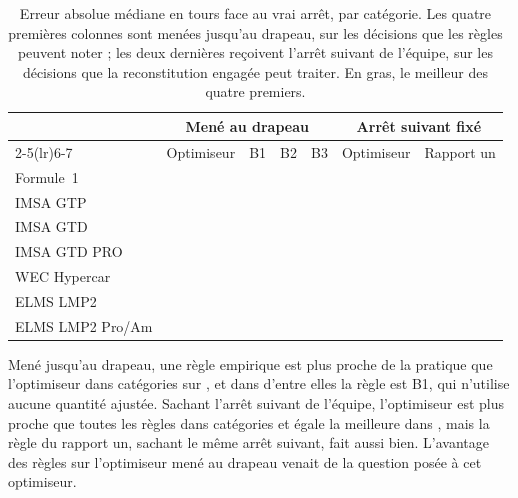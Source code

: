 \documentclass[11pt,a4paper]{article}
\begin{document}
\begin{table}[htbp]
\centering
\caption{Erreur absolue médiane en tours face au vrai arrêt, par catégorie. Les
quatre premières colonnes sont menées jusqu'au drapeau, sur les \NScored{}
décisions que les règles peuvent noter ; les deux dernières reçoivent l'arrêt
suivant de l'équipe, sur les décisions que la reconstitution engagée peut
traiter. En gras, le meilleur des quatre premiers.}
\label{tab:baselines}
\begin{tabular}{lrrrrrr}
\toprule
& \multicolumn{4}{c}{Mené au drapeau} & \multicolumn{2}{c}{Arrêt suivant fixé} \\
\cmidrule(lr){2-5}\cmidrule(lr){6-7}
& Optimiseur & B1 & B2 & B3 & Optimiseur & Rapport un \\
\midrule
Formule~1        & \FoneModelError{}            & \FoneBoneError{}            & \textbf{\FoneBtwoError{}}   & \FoneBthreeError{} & \FoneCommitError{} & \FoneRatioOneError{} \\
IMSA GTP         & \ImsaGtpModelError{}         & \ImsaGtpBoneError{}         & \ImsaGtpBtwoError{}         & \ImsaGtpBthreeError{} & \ImsaGtpCommitError{} & \ImsaGtpRatioOneError{} \\
IMSA GTD         & \ImsaGtdModelError{}         & \textbf{\ImsaGtdBoneError{}}     & \ImsaGtdBtwoError{}    & \ImsaGtdBthreeError{} & \ImsaGtdCommitError{} & \ImsaGtdRatioOneError{} \\
IMSA GTD PRO     & \ImsaGtdproModelError{}      & \textbf{\ImsaGtdproBoneError{}}  & \ImsaGtdproBtwoError{} & \ImsaGtdproBthreeError{} & \ImsaGtdproCommitError{} & \ImsaGtdproRatioOneError{} \\
WEC Hypercar     & \WecHypercarModelError{}     & \WecHypercarBoneError{}     & \WecHypercarBtwoError{}     & \textbf{\WecHypercarBthreeError{}} & \WecHypercarCommitError{} & \WecHypercarRatioOneError{} \\
ELMS LMP2        & \textbf{\ElmsLmptwoModelError{}} & \ElmsLmptwoBoneError{}  & \ElmsLmptwoBtwoError{}      & \ElmsLmptwoBthreeError{} & \ElmsLmptwoCommitError{} & \ElmsLmptwoRatioOneError{} \\
ELMS LMP2 Pro/Am & \ElmsLmptwoProAmModelError{} & \textbf{\ElmsLmptwoProAmBoneError{}} & \ElmsLmptwoProAmBtwoError{} & \ElmsLmptwoProAmBthreeError{} & \ElmsLmptwoProAmCommitError{} & \ElmsLmptwoProAmRatioOneError{} \\
\bottomrule
\end{tabular}
\end{table}

Mené jusqu'au drapeau, une règle empirique est plus proche de la pratique que
l'optimiseur dans \NClassesRuleWins{} catégories sur \NClassesScored{}, et dans
\NClassesBoneWins{} d'entre elles la règle est B1, qui n'utilise aucune quantité
ajustée. Sachant l'arrêt suivant de l'équipe, l'optimiseur est plus proche que
toutes les règles dans \NClassesCommitBeatsRules{} catégories et égale la
meilleure dans \NClassesCommitTiesRules{}, mais la règle du rapport un, sachant
le même arrêt suivant, fait aussi bien. L'avantage des règles sur l'optimiseur
mené au drapeau venait de la question posée à cet optimiseur.
\end{document}
